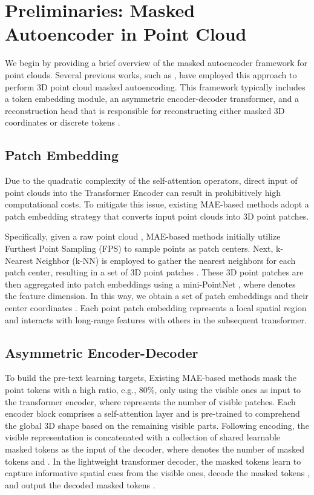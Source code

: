 \documentclass[sigconf, screen]{acmart}
\begin{document}
\section{Preliminaries: Masked Autoencoder in Point Cloud}
We begin by providing a brief overview of the masked autoencoder framework for point clouds. Several previous works, such as \cite{yu2022point, dong2022autoencoders, pang2022masked, zhang2022point}, have employed this approach to perform 3D point cloud masked autoencoding. This framework typically includes a token embedding module, an asymmetric encoder-decoder transformer, and a reconstruction head that is responsible for reconstructing either masked 3D coordinates \cite{pang2022masked, zhang2022point} or discrete tokens \cite{yu2022point, dong2022autoencoders}.
\subsection{Patch Embedding} 
Due to the quadratic complexity of the self-attention operators, direct input of point clouds into the Transformer Encoder can result in prohibitively high computational costs. To mitigate this issue, existing MAE-based methods \cite{pang2022masked, yu2022point} adopt a patch embedding strategy that converts input point clouds into 3D point patches. 

Specifically, given a raw point cloud , MAE-based methods initially utilize Furthest Point Sampling (FPS) to sample  points  as patch centers. Next, k-Nearest Neighbor (k-NN) is employed to gather the  nearest neighbors for each patch center, resulting in a set of 3D point patches . These 3D point patches are then aggregated into patch embeddings  using a mini-PointNet \cite{qi2017pointnet}, where  denotes the feature dimension. In this way, we obtain a set of patch embeddings  and their center coordinates .
Each point patch embedding represents a local spatial region and interacts with long-range features with others in the subsequent transformer. 


\subsection{Asymmetric Encoder-Decoder}
To build the pre-text learning targets, Existing MAE-based methods \cite{pang2022masked, dong2022autoencoders, zhang2022learning} mask the point tokens with a high ratio, e.g., 80\%,  only using the visible ones  as input to the transformer encoder, where  represents the number of visible patches. Each encoder block comprises a self-attention layer and is pre-trained to comprehend the global 3D shape based on the remaining visible parts. Following encoding, the visible representation  is concatenated with a collection of shared learnable masked tokens  as the input of the decoder, where  denotes the number of masked tokens and . In the lightweight transformer decoder, the masked tokens learn to capture informative spatial cues from the visible ones, decode the masked tokens , and output the decoded masked tokens .
  
\end{document}
